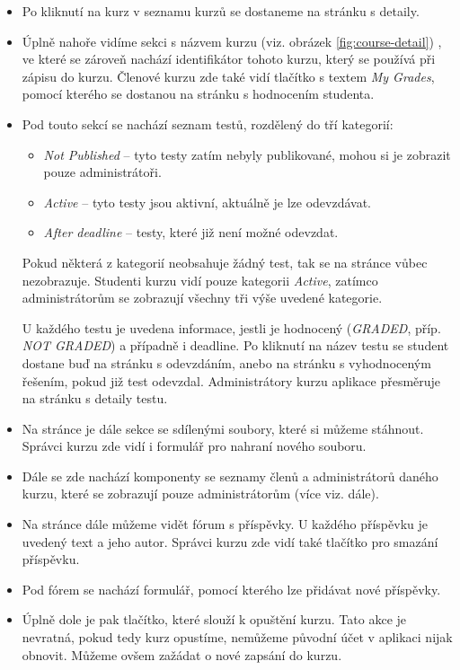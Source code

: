 \begin{itemize}
	\item Po kliknutí na kurz v seznamu kurzů se dostaneme na stránku s detaily.
	\item Úplně nahoře vidíme sekci s názvem kurzu (viz. obrázek \ref{fig:course-detail}) , ve které se zároveň nachází identifikátor tohoto kurzu, který se používá při zápisu do kurzu. Členové kurzu zde také vidí tlačítko s textem \textit{My Grades}, pomocí kterého se dostanou na stránku s hodnocením studenta.
	\item Pod touto sekcí se nachází seznam testů, rozdělený do tří kategorií:
		\begin{itemize}
			\item \textit{Not Published} -- tyto testy zatím nebyly publikované, mohou si je zobrazit pouze administrátoři.
			\item \textit{Active} -- tyto testy jsou aktivní, aktuálně je lze odevzdávat.
			\item \textit{After deadline} -- testy, které již není možné odevzdat.
		\end{itemize}
		Pokud některá z kategorií neobsahuje žádný test, tak se na stránce vůbec nezobrazuje. Studenti kurzu vidí pouze kategorii \textit{Active}, zatímco administrátorům se zobrazují všechny tři výše uvedené kategorie.
		
		U každého testu je uvedena informace, jestli je hodnocený (\textit{GRADED}, příp. \textit{NOT GRADED}) a případně i deadline.
		Po kliknutí na název testu se student dostane buď na stránku s odevzdáním, anebo na stránku s vyhodnoceným řešením, pokud již test odevzdal. Administrátory kurzu aplikace přesměruje na stránku s detaily testu.
		
	\item Na stránce je dále sekce se sdílenými soubory, které si můžeme stáhnout. Správci kurzu zde vidí i formulář pro nahraní nového souboru.
	\item Dále se zde nachází komponenty se seznamy členů a administrátorů daného kurzu, které se zobrazují pouze administrátorům (více viz. dále).
	\item Na stránce dále můžeme vidět fórum s příspěvky. U každého příspěvku je uvedený text a jeho autor. Správci kurzu zde vidí také tlačítko pro smazání příspěvku.
	\item Pod fórem se nachází formulář, pomocí kterého lze přidávat nové příspěvky.
	\item Úplně dole je pak tlačítko, které slouží k opuštění kurzu. Tato akce je nevratná, pokud tedy kurz opustíme, nemůžeme původní účet v aplikaci nijak obnovit. Můžeme ovšem zažádat o nové zapsání do kurzu.
\end{itemize}

